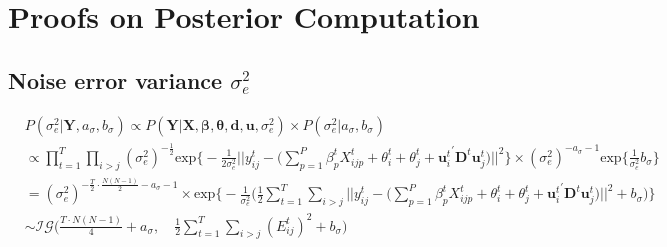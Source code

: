 \documentclass[a4paper]{article}
\begin{document}
\section{Proofs on Posterior Computation}
\subsection{Noise error variance $\sigma_e^2$} \label{sigma2}
\begin{equation}
\begin{aligned}
&P(\sigma_e^2|\mathbf{Y}, a_\sigma, b_\sigma) \propto P(\mathbf{Y}|\mathbf{X}, \boldsymbol{\beta}, \boldsymbol{\theta}, \boldsymbol{d}, \boldsymbol{u},\sigma_e^2)\times P(\sigma_e^2|a_\sigma, b_\sigma)\\
&\propto\prod\limits_{t=1}^T\prod\limits_{i> j}(\sigma_e^2)^{-\frac{1}{2}}\mbox{exp}\Big\{-\frac{1}{2\sigma_e^2}||y^t_{ij}-\big(\sum\limits_{p=1}^P \beta^t_{p}X^t_{ijp}+\theta^t_{i}+\theta^t_{j}+{\boldsymbol{u}^t_{i}}^\prime \mathbf{D}^t\boldsymbol{u}^t_{j}\big)||^2\Big\}\times (\sigma_e^2)^{-a_\sigma-1}\mbox{exp}\Big\{\frac{1}{\sigma_e^2}b_\sigma\Big\}\\
&=(\sigma_e^2)^{-\frac{T}{2}\cdot\frac{N(N-1)}{2}-a_\sigma-1}\times\mbox{exp}\Big\{-\frac{1}{\sigma_e^2}\Big(\frac{1}{2}\sum\limits_{t=1}^T\sum\limits_{i> j}||y^t_{ij}-\big(\sum\limits_{p=1}^P \beta^t_{p}X^t_{ijp}+\theta^t_{i}+\theta^t_{j}+{\boldsymbol{u}^t_{i}}^\prime \mathbf{D}^t\boldsymbol{u}^t_{j}\big)||^2+b_\sigma\Big)\Big\}\\
&\sim \mathcal{IG}\big(\frac{T\cdot N(N-1)}{4}+a_\sigma,\quad \frac{1}{2}\sum\limits_{t=1}^T\sum\limits_{i> j}(E^t_{ij})^2+b_\sigma\big)	
\end{aligned}
\end{equation} 
\end{document}
